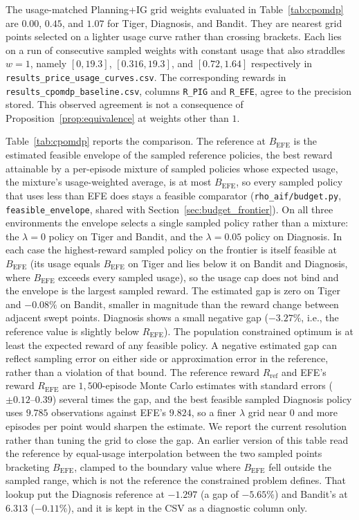 The usage-matched Planning+IG grid weights evaluated in Table~\ref{tab:cpomdp} are $0.00$, $0.45$, and $1.07$ for Tiger, Diagnosis, and Bandit. They are nearest grid points selected on a lighter usage curve rather than crossing brackets. Each lies on a run of consecutive sampled weights with constant usage that also straddles $w{=}1$, namely $[0,19.3]$, $[0.316,19.3]$, and $[0.72,1.64]$ respectively in \texttt{results\_price\_usage\_curves.csv}. The corresponding rewards in \texttt{results\_cpomdp\_baseline.csv}, columns \texttt{R\_PIG} and \texttt{R\_EFE}, agree to the precision stored. This observed agreement is not a consequence of Proposition~\ref{prop:equivalence} at weights other than $1$.

Table~\ref{tab:cpomdp} reports the comparison. The reference at $B_{\mathrm{EFE}}$ is the estimated feasible envelope of the sampled reference policies, the best reward attainable by a per-episode mixture of sampled policies whose expected usage, the mixture's usage-weighted average, is at most $B_{\mathrm{EFE}}$, so every sampled policy that uses less than EFE does stays a feasible comparator (\texttt{rho\_\allowbreak aif/\allowbreak budget.py}, \texttt{feasible\_\allowbreak envelope}, shared with Section~\ref{sec:budget_frontier}). On all three environments the envelope selects a single sampled policy rather than a mixture: the $\lambda{=}0$ policy on Tiger and Bandit, and the $\lambda{=}0.05$ policy on Diagnosis. In each case the highest-reward sampled policy on the frontier is itself feasible at $B_{\mathrm{EFE}}$ (its usage equals $B_{\mathrm{EFE}}$ on Tiger and lies below it on Bandit and Diagnosis, where $B_{\mathrm{EFE}}$ exceeds every sampled usage), so the usage cap does not bind and the envelope is the largest sampled reward. The estimated gap is zero on Tiger and $-0.08\%$ on Bandit, smaller in magnitude than the reward change between adjacent swept points. Diagnosis shows a small negative gap ($-3.27\%$, i.e., the reference value is slightly below $R_{\mathrm{EFE}}$). The population constrained optimum is at least the expected reward of any feasible policy. A negative estimated gap can reflect sampling error on either side or approximation error in the reference, rather than a violation of that bound. The reference reward $R_{\mathrm{ref}}$ and EFE's reward $R_{\mathrm{EFE}}$ are $1{,}500$-episode Monte Carlo estimates with standard errors ($\pm 0.12$--$0.39$) several times the gap, and the best feasible sampled Diagnosis policy uses $9.785$ observations against EFE's $9.824$, so a finer $\lambda$ grid near $0$ and more episodes per point would sharpen the estimate. We report the current resolution rather than tuning the grid to close the gap. An earlier version of this table read the reference by equal-usage interpolation between the two sampled points bracketing $B_{\mathrm{EFE}}$, clamped to the boundary value where $B_{\mathrm{EFE}}$ fell outside the sampled range, which is not the reference the constrained problem defines. That lookup put the Diagnosis reference at $-1.297$ (a gap of $-5.65\%$) and Bandit's at $6.313$ ($-0.11\%$), and it is kept in the CSV as a diagnostic column only.

